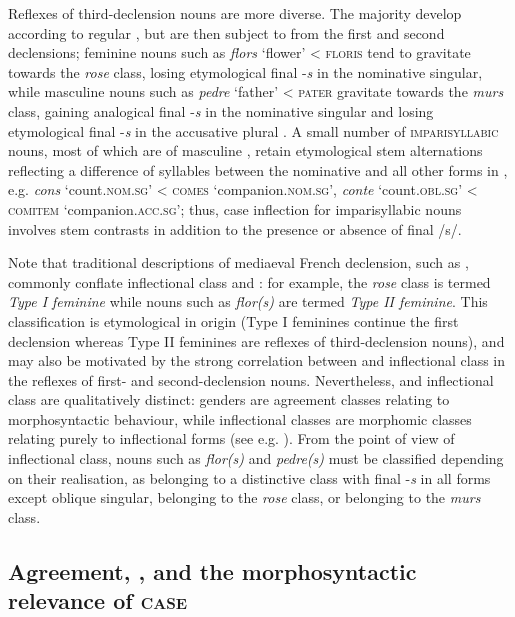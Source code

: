 \documentclass[output=paper,colorlinks,citecolor=brown]{langscibook}
\begin{document}
Reflexes of third-declension nouns are more diverse. The majority develop according to regular , but are then subject to  from the first and second declensions; feminine nouns such as \emph{flors} `flower' \textless{} \textsc{floris} tend to gravitate towards the \emph{rose} class, losing etymological final -\emph{s} in the nominative singular, while masculine nouns such as \emph{pedre} `father' \textless{} \textsc{pater} gravitate towards the \emph{murs} class, gaining analogical final -\emph{s} in the nominative singular and losing etymological final -\emph{s} in the accusative plural \citep{simswilliamsbaerman2021}. A small number of \textsc{imparisyllabic} nouns, most of which are of masculine , retain etymological stem alternations reflecting a difference of syllables between the nominative and all other forms in , e.g. \emph{cons} `count.\textsc{nom.sg}' \textless{} \textsc{comes} `companion.\textsc{nom.sg'}, \emph{conte} `count.\textsc{obl.sg}' \textless{} \textsc{comitem} `companion.\textsc{acc.sg';} thus, case inflection for imparisyllabic nouns involves stem contrasts in addition to the presence or absence of final /s/.

Note that traditional descriptions of mediaeval French declension, such as \citet{buridant2019}, commonly conflate inflectional class and : for example, the \emph{rose} class is termed \textit{Type I feminine} while nouns such as \emph{flor(s)} are termed \textit{Type II feminine}. This classification is etymological in origin (Type I feminines continue the  first declension whereas Type II feminines are reflexes of third-declension nouns), and may also be motivated by the strong correlation between  and inflectional class in the reflexes of  first- and second-declension nouns. Nevertheless,  and inflectional class are qualitatively distinct: genders are agreement classes relating to morphosyntactic behaviour, while inflectional classes are morphomic classes relating purely to inflectional forms (see e.g. \citealt{corbett2012}). From the point of view of inflectional class, nouns such as \emph{flor(s)} and \emph{pedre(s)} must be classified depending on their realisation, as belonging to a distinctive class with final -\emph{s} in all forms except oblique singular, belonging to the \emph{rose} class, or belonging to the \emph{murs} class.

\subsection{Agreement, \textsc{}, and the morphosyntactic relevance of \textsc{case}} \label{06sec4.4}
\end{document}
